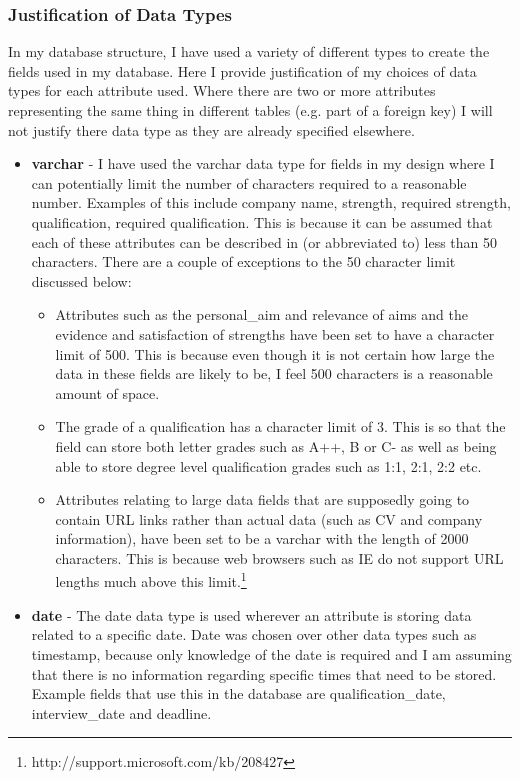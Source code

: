\documentclass{article}
\begin{document}
\subsubsection{Justification of Data Types}
In my database structure, I have used a variety of different types to create the fields used in my database. Here I provide justification of my choices of data types for each attribute used. Where there are two or more attributes representing the same thing in different tables (e.g. part of a foreign key) I will not justify there data type as they are already specified elsewhere.

\begin{itemize}
\item \textbf{varchar} - I have used the varchar data type for fields in my design where I can potentially limit the number of characters required to a reasonable number. Examples of this include company name, strength, required strength, qualification, required qualification. This is because it can be assumed that each of these attributes can be described in (or abbreviated to) less than 50 characters. There are a couple of exceptions to the 50 character limit discussed below:

\begin{itemize}
\item Attributes such as the personal\_aim and relevance of aims and the evidence and satisfaction of strengths have been set to have a character limit of 500. This is because even though it is not certain how large the data in these fields are likely to be, I feel 500 characters is a reasonable amount of space.

\item The grade of a qualification has a character limit of 3. This is so that the field can store both letter grades such as A++, B or C- as well as being able to store degree level qualification grades such as 1:1, 2:1, 2:2 etc. 

\item Attributes relating to large data fields that are supposedly going to contain URL links rather than actual data (such as CV and company information), have been set to be a varchar with the length of 2000 characters. This is because web browsers such as IE do not support URL lengths much above this limit.\footnote{http://support.microsoft.com/kb/208427}

\end{itemize}

\item \textbf{date} - The date data type is used wherever an attribute is storing data related to a specific date. Date was chosen over other data types such as timestamp, because only knowledge of the date is required and I am assuming that there is no information regarding specific times that need to be stored. Example fields that use this in the database are qualification\_date, interview\_date and deadline.


\end{itemize}
\end{document}
